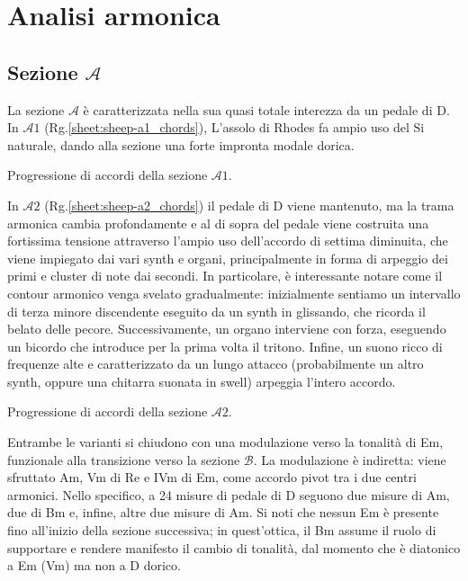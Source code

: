\documentclass[class=book, crop=false, oneside, 12pt]{standalone}
\begin{document}
    \section{Analisi armonica}
    \label{sec:03-harmony}

    \subsection{Sezione \(\mathcal{A}\)}
    La sezione \(\mathcal{A}\) è caratterizzata nella sua quasi totale interezza da un pedale di D. In \(\mathcal{A}1\) (Rg.\ref{sheet:sheep-a1_chords}), L'assolo di Rhodes fa ampio uso del Si naturale, dando alla sezione una forte impronta modale dorica.     
    
    \begin{sheet}[htbp]
        \centering
        \caption{Progressione di accordi della sezione \(\mathcal{A}1\).}
        \label{sheet:sheep-a1_chords}
    \end{sheet}

    In \(\mathcal{A}2\) (Rg.\ref{sheet:sheep-a2_chords}) il pedale di D viene mantenuto, ma la trama armonica cambia profondamente e al di sopra del pedale viene costruita una fortissima tensione attraverso l'ampio uso dell'accordo di settima diminuita, che viene impiegato dai vari synth e organi, principalmente in forma di arpeggio dei primi e cluster di note dai secondi. In particolare, è interessante notare come il contour armonico venga svelato gradualmente: inizialmente sentiamo un intervallo di terza minore discendente eseguito da un synth in glissando, che ricorda il belato delle pecore.
    Successivamente, un organo interviene con forza, eseguendo un bicordo che introduce per la prima volta il tritono. Infine, un suono ricco di frequenze alte e caratterizzato da un lungo attacco (probabilmente un altro synth, oppure una chitarra suonata in swell) arpeggia l'intero accordo. 
    
    \begin{sheet}[htbp]
        \centering
        \caption{Progressione di accordi della sezione \(\mathcal{A}2\).}
        \label{sheet:sheep-a2_chords}
    \end{sheet}

    Entrambe le varianti si chiudono con una modulazione verso la tonalità di Em, funzionale alla transizione verso la sezione \(\mathcal{B}\). La modulazione è indiretta: viene sfruttato Am, Vm di Re e IVm di Em,  come accordo pivot tra i due centri armonici. Nello specifico, a 24 misure di pedale di D seguono due misure di Am, due di Bm e, infine, altre due misure di Am. Si noti che nessun Em è presente fino all'inizio della sezione successiva; in quest'ottica,  il Bm assume il ruolo di supportare e rendere manifesto il cambio di tonalità, dal momento che è diatonico a Em (Vm) ma non a D dorico. 
\end{document}
